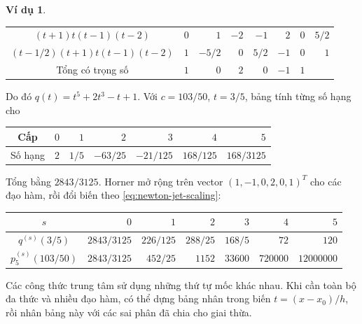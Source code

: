 \documentclass[12pt,a4paper,oneside]{book}
\numberwithin{algorithm}{chapter}
\theoremstyle{definition}
\newtheorem{vidu}{Ví dụ}[chapter]
\begin{document}
\begin{vidu}
\begin{center}
\begin{tabular}{c|rrrrrr|r}
$(t+1)t(t-1)(t-2)$&$0$&$1$&$-2$&$-1$&$2$&$0$&$5/2$\\
$(t-1/2)(t+1)t(t-1)(t-2)$&$1$&$-5/2$&$0$&$5/2$&$-1$&$0$&$1$\\\midrule
Tổng có trọng số&$1$&$0$&$2$&$0$&$-1$&$1$&\\\bottomrule
\end{tabular}
\end{center}
Do đó $q(t)=t^5+2t^3-t+1$. Với $c=103/50$, $t=3/5$, bảng tính từng số hạng cho
\begin{center}
\begin{tabular}{c|rrrrrr}\toprule
Cấp&$0$&$1$&$2$&$3$&$4$&$5$\\\midrule
Số hạng&$2$&$1/5$&$-63/25$&$-21/125$&$168/125$&$168/3125$\\\bottomrule
\end{tabular}
\end{center}
Tổng bằng $2843/3125$. Horner mở rộng trên vector $(1,-1,0,2,0,1)^T$ cho các đạo hàm, rồi đổi biến theo \eqref{eq:newton-jet-scaling}:
\begin{center}
\small
\begin{tabular}{c|rrrrrr}\toprule
$s$&$0$&$1$&$2$&$3$&$4$&$5$\\\midrule
$q^{(s)}(3/5)$&$2843/3125$&$226/125$&$288/25$&$168/5$&$72$&$120$\\
$p_5^{(s)}(103/50)$&$2843/3125$&$452/25$&$1152$&$33600$&$720000$&$12000000$\\\bottomrule
\end{tabular}
\end{center}
\end{vidu}


Các công thức trung tâm sử dụng những thứ tự mốc khác nhau. Khi cần toàn bộ đa thức và nhiều đạo hàm, có thể dựng bảng nhân trong biến $t=(x-x_0)/h$, rồi nhân bảng này với các sai phân đã chia cho giai thừa.
\end{document}
